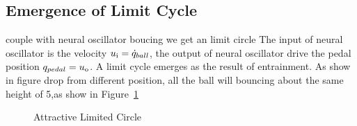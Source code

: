 \subsection*{Emergence of Limit Cycle}
couple with neural oscillator boucing we get an limit circle
The input of neural oscillator is the velocity $u_{\mathrm{i}}=\dot{q}_{ball}$, the output of neural oscillator  drive the pedal position $q_{pedal}=u_{\mathrm{o}}$.
A limit cycle emerges as the result of entrainment.
As show in figure drop from different position, all the ball will bouncing  about the same height of 5,as show in Figure~\ref{fig:bb_attractive_circle}

\begin{figure}[h]
\begin{center}
	
\end{center}
\caption{Attractive Limited Circle}
\label{fig:bb_attractive_circle}
\end{figure}

